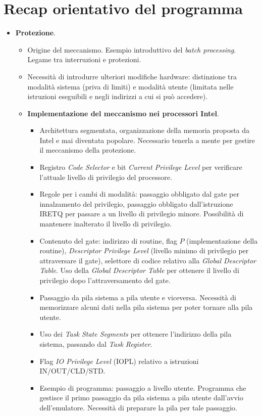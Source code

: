 \documentclass[11pt]{report}
\theoremstyle{definition}
\begin{document}
\chapter{Recap orientativo del programma}
\begin{itemize}
	\item \textbf{Protezione}.
	\begin{itemize}
		\item Origine del meccanismo. Esempio introduttivo del \emph{batch processing}. Legame tra interruzioni e protezioni.
		\item Necessità di introdurre ulteriori modifiche hardware: distinzione tra modalità sistema (priva di limiti) e modalità utente (limitata nelle istruzioni eseguibili e negli indirizzi a cui si può accedere).
		\item \textbf{Implementazione del meccanismo nei processori Intel}.
		\begin{itemize}
			\item Architettura segmentata, organizzazione della memoria proposta da Intel e mai diventata popolare. Necessario tenerla a mente per gestire il meccanismo della protezione.
			\item Registro \emph{Code  Selector} e bit \emph{Current Privilege Level} per verificare l'attuale livello di privilegio del processore.
			\item Regole per i cambi di modalità: passaggio obbligato dal gate per innalzamento del privilegio, passaggio obbligato dall'istruzione IRETQ per passare a un livello di privilegio minore. Possibilità di mantenere inalterato il livello di privilegio.
			\item Contenuto del gate: indirizzo di routine, flag $P$ (implementazione della routine), \emph{Descriptor Privilege Level} (livello minimo di privilegio per attraversare il gate), selettore di codice relativo alla \emph{Global Descriptor Table}. Uso della \emph{Global Descriptor Table} per ottenere il livello di privilegio dopo l'attraversamento del gate.
			\item Passaggio da pila sistema a pila utente e viceversa. Necessità di memorizzare alcuni dati nella pila sistema per poter tornare alla pila utente.
			\item Uso dei \emph{Task State Segments} per ottenere l'indirizzo della pila sistema, passando dal \emph{Task Register}.
			\item Flag \emph{IO Privilege Level} (IOPL) relativo a istruzioni  IN/OUT/CLD/STD.
			\item Esempio di programma: passaggio a livello utente. Programma che gestisce il primo passaggio da pila sistema a pila utente dall'avvio dell'emulatore. Necessità di preparare la pila per tale passaggio.

\end{itemize}
\end{itemize}
\end{itemize}
\end{document}
